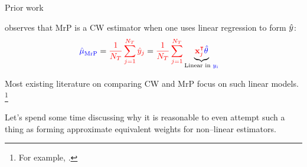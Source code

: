 
\begin{frame}{Prior work}

\textcite{gelman:2007:struggles} observes that MrP is a CW estimator when
one uses linear regression to form $\hat{y}$:
$$
\begin{aligned}
\textcolor{blue}{\hat{\mu}^{}_{\mathrm{MrP}}} ={}& \textcolor{red}{\frac{1}{{N_T}} \sum_{j=1}^{N_T} \hat{y}_j} =
\textcolor{red}{\frac{1}{{N_T}} \sum_{j=1}^{N_T} }
\underbrace{\textcolor{red}{\mathbf{x}_j^\intercal} \textcolor{blue}{\hat{\theta}}}_{\textrm{Linear in }\textcolor{blue}{y_i}}
\end{aligned}
$$

Most existing literature on comparing CW and MrP focus on such linear models.
\footnote{
    For example,
    \textcite{gelman:2007:struggles,benmichael:2021:multilevel,chattopadhyay:2023:implied}.}

\vspace{1em}

Let's spend some time discussing why it is reasonable
to even attempt such a thing as forming approximate equivalent
weights for non--linear estimators.

\end{frame}







